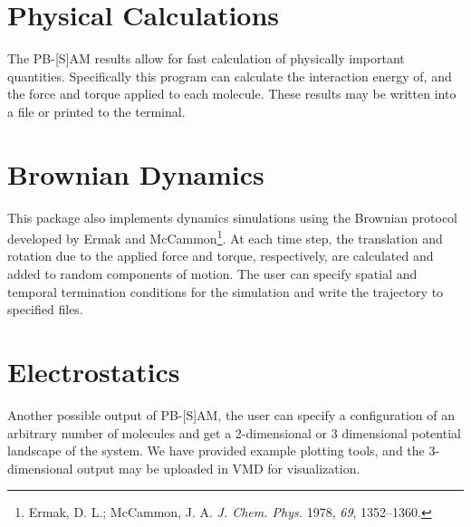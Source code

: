 \section{Physical Calculations} The PB-[S]AM results allow for fast calculation of physically important quantities. 
Specifically this program can calculate the interaction energy of, and the force and torque 
applied to each molecule. These results may be written into a file or printed to the terminal.

\section{Brownian Dynamics} This package also implements dynamics simulations using the 
Brownian protocol developed by Ermak and McCammon\footnote{Ermak, D. L.; McCammon, J. A. \textit{J. Chem. Phys.} 
1978, \textit{69}, 1352\---1360.}. At each time step, the translation and rotation due to the applied 
force and torque, respectively, are calculated and added to random components of motion. The user can specify 
spatial and temporal termination conditions for the simulation and write the trajectory to specified files.

\section{Electrostatics} Another possible output of PB-[S]AM, the user can specify a configuration of an 
arbitrary number of molecules and get a 2-dimensional or 3 dimensional potential landscape of the 
system. We have provided example plotting tools, and the 3-dimensional output may be 
uploaded in VMD for visualization.

\clearpage